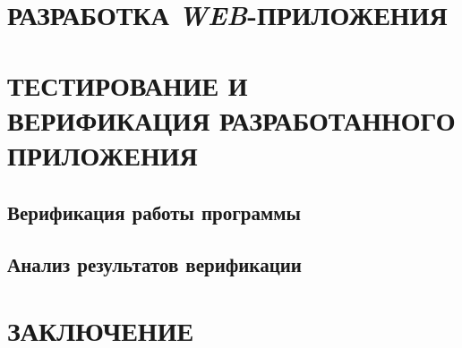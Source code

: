 \documentclass[12pt,a4paper]{styles/report}
\begin{document}
\chapter{РАЗРАБОТКА \textit{WEB}-ПРИЛОЖЕНИЯ}


\chapter{ТЕСТИРОВАНИЕ И ВЕРИФИКАЦИЯ РАЗРАБОТАННОГО ПРИЛОЖЕНИЯ}
\section{Верификация работы программы}

\section{Анализ результатов верификации}


\newpage
\chapter*{ЗАКЛЮЧЕНИЕ}


\newpage
\begin{thebibliography}{9999.}



\end{thebibliography}


\end{document}
